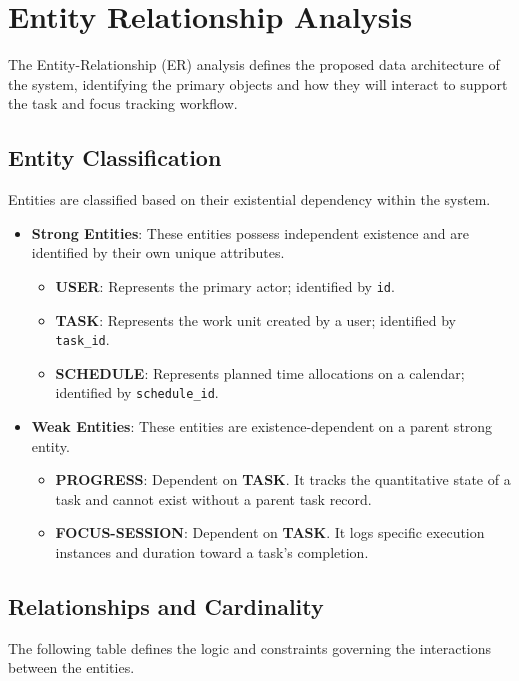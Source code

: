     \section{Entity Relationship Analysis}
    The Entity-Relationship (ER) analysis defines the proposed data architecture of the system, identifying the primary objects and how they will interact to support the task and focus tracking workflow.

    \subsection{Entity Classification}
    Entities are classified based on their existential dependency within the system.

    \begin{itemize}
        \item \textbf{Strong Entities}: These entities possess independent existence and are identified by their own unique attributes.
        \begin{itemize}
            \item \textbf{USER}: Represents the primary actor; identified by \texttt{id}.
            \item \textbf{TASK}: Represents the work unit created by a user; identified by \texttt{task\_id}.
            \item \textbf{SCHEDULE}: Represents planned time allocations on a calendar; identified by \texttt{schedule\_id}.
        \end{itemize}
        \item \textbf{Weak Entities}: These entities are existence-dependent on a parent strong entity.
        \begin{itemize}
            \item \textbf{PROGRESS}: Dependent on \textbf{TASK}. It tracks the quantitative state of a task and cannot exist without a parent task record.
            \item \textbf{FOCUS-SESSION}: Dependent on \textbf{TASK}. It logs specific execution instances and duration toward a task's completion.
        \end{itemize}
    \end{itemize}

    \subsection{Relationships and Cardinality}
    The following table defines the logic and constraints governing the interactions between the entities.

